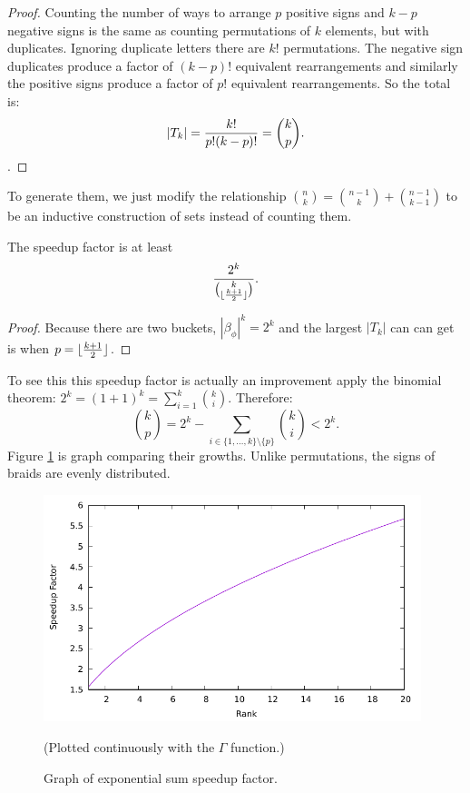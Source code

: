 \documentclass[12pt]{thesis}
\begin{document}
\begin{proof}
    Counting the number of ways to arrange $p$ positive signs and $k-p$ negative
    signs is the same as counting permutations of $k$ elements, but with duplicates.
    Ignoring duplicate letters there are $k!$ permutations.
    The negative sign duplicates produce a factor of $(k-p)!$ equivalent rearrangements
    and similarly the positive signs produce a factor of $p!$ equivalent rearrangements.
    So the total is:
    \[
        |T_{k}| = \frac{k!}{p!(k-p)!} = {k \choose p}. \qedhere
    \].
\end{proof}
To generate them, we just modify the
relationship ${n \choose k} = {n - 1 \choose k} + {n - 1 \choose k - 1 }$ to be an inductive
construction of sets instead of counting them.

\begin{theorem}
    The speedup factor is at least 
    \[
        \frac{2^{k}}{ { k \choose \lfloor \frac{k + 1}{2} \rfloor}}.
    \]
\end{theorem}

\begin{proof}
    Because there are two buckets, $|\beta_{\phi}|^{k} = 2^{k}$ and the largest $|T_{k}|$
    can can get is when $p = \lfloor \frac{k + 1}{2} \rfloor$.
\end{proof}
To see this this speedup factor is actually an improvement
apply the binomial theorem:
$2^{k} = (1 + 1)^{k} = \sum_{i=1}^{k} {k \choose i}$.
Therefore:
\[
    { k \choose p } = 2^{k} - \sum_{i \in \{ 1, \ldots, k \} \setminus \{ p \} } {k \choose i} < 2^{k}. 
\]
Figure \ref{fig:sum-speedup} is graph comparing their growths. 
Unlike permutations, the signs of braids are evenly distributed.

\begin{figure}[h]
    \centering
    \includegraphics[width=11cm]{sum-speedup.pdf}
    \caption{Graph of exponential sum speedup factor. }
    \label{fig:sum-speedup}
 
    (Plotted continuously with the $\Gamma$ function.)
\end{figure}
\end{document}
